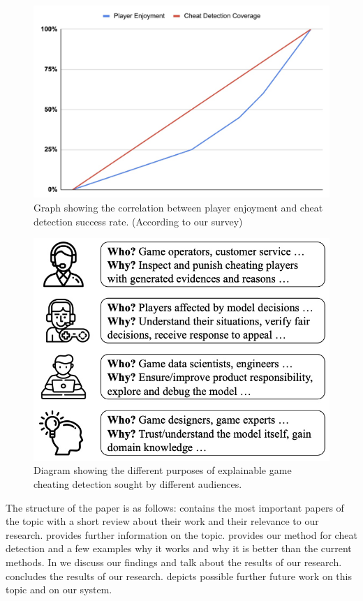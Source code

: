 \begin{figure}[h]
\centering
\includegraphics[width=0.8\linewidth]{images/enjoyment.jpeg}
\captionsetup{width=0.8\textwidth}
\caption{\label{fig:enjoyment}Graph showing the correlation between player enjoyment and cheat detection success rate. (According to our survey)}
\end{figure}

\begin{figure}[h]
\centering
\includegraphics[width=0.4\linewidth]{images/purpose.jpeg}
\captionsetup{width=0.4\textwidth}
\caption{\label{fig:purpose}Diagram showing the different purposes of explainable game cheating detection sought by different audiences.}
\end{figure}

The structure of the paper is as follows:  contains the most important papers of the topic with a short review about their work and their relevance to our research.
 provides further information on the topic.
 provides our method for cheat detection and a few examples why it works and why it is better than the current methods.
In  we discuss our findings and talk about the results of our research.
 concludes the results of our research.
 depicts possible further future work on this topic and on our system.